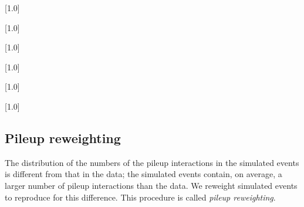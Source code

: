 \begin{table}[!p]
 \centering
{}
 \scriptsize
 \scalebox{.7}[1.0]{}
\end{table}

\begin{table}[!p]
 \centering
{}
 \scriptsize
 \scalebox{.7}[1.0]{}
\end{table}

\begin{table}[!p]
 \centering
{}
 \scriptsize
 \scalebox{.7}[1.0]{}
\end{table}

\begin{table}[!p]
 \centering
{}
 \scriptsize
 \scalebox{.7}[1.0]{}
\end{table}

\begin{table}[!p]
 \centering
 \scriptsize
 \scalebox{.7}[1.0]{}
\end{table}

\begin{table}[!p]
 \centering
 \scriptsize
 \scalebox{.7}[1.0]{}
 \label{tab:datasets_dm_ttbar_pseudoscalar}
\end{table}

\clearpage

\subsection{Pileup reweighting}

The distribution of the numbers of the pileup interactions in the
simulated events is different from that in the data; the simulated
events contain, on average, a larger number of pileup interactions than
the data. We reweight simulated events to reproduce  for this difference.
This procedure is called \textit{pileup reweighting}.

